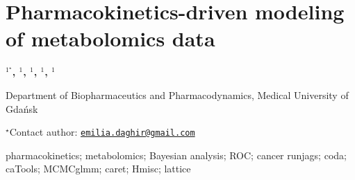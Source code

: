 \documentclass[\main/boa.tex]{subfiles}
\begin{document}
\section{Pharmacokinetics-driven modeling of metabolomics data}

\begin{center}
  {\bf {}$^{1^\star}$, $^{1}$, $^{1}$, $^{1}$, $^{1}$}
\end{center}

\vskip 0.3cm

\begin{affiliations}
\begin{enumerate}
\begin{minipage}{0.915\textwidth}
\centering
\item Department of Biopharmaceutics and Pharmacodynamics, Medical University
of Gdańsk \\[-2pt]
\end{minipage}
\end{enumerate}
$^\star$Contact author: \href{mailto:emilia.daghir@gmail.com}{\nolinkurl{emilia.daghir@gmail.com}}\\
\end{affiliations}

\vskip 0.5cm

\begin{minipage}{0.915\textwidth}
\keywords pharmacokinetics; metabolomics; Bayesian analysis; ROC; cancer
\packages runjags; coda; caTools; MCMCglmm; caret; Hmisc; lattice
\end{minipage}

\vskip 0.8cm
\end{document}

